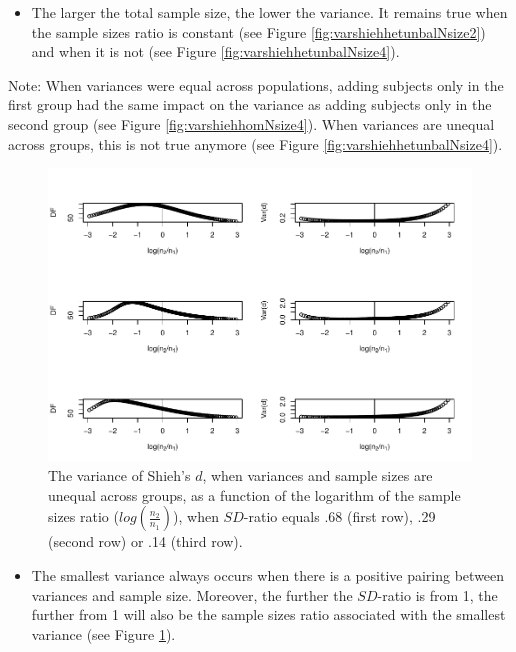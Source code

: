 \documentclass[
  english,
  man,mask]{apa6}
\providecommand{\tightlist}{%
  \setlength{\itemsep}{0pt}\setlength{\parskip}{0pt}}
\begin{document}
\begin{itemize}
\tightlist
\item
  The larger the total sample size, the lower the variance. It remains true when the sample sizes ratio is constant (see Figure \ref{fig:varshiehhetunbalNsize2}) and when it is not (see Figure \ref{fig:varshiehhetunbalNsize4}).
\end{itemize}

Note: When variances were equal across populations, adding subjects only in the first group had the same impact on the variance as adding subjects only in the second group (see Figure \ref{fig:varshiehhomNsize4}). When variances are unequal across groups, this is not true anymore (see Figure \ref{fig:varshiehhetunbalNsize4}).

\begin{figure}
\centering
\includegraphics{Theoretical-Variance-of-all-estimators-as-a-function-of-population-parameters_files/figure-latex/varshiehhetunbaldfandvar-1.pdf}
\caption{\label{fig:varshiehhetunbaldfandvar}The variance of Shieh's \(d\), when variances and sample sizes are unequal across groups, as a function of the logarithm of the sample sizes ratio (\(log \left( \frac{n_2}{n_1} \right)\)), when \(SD\)-ratio equals .68 (first row), .29 (second row) or .14 (third row).}
\end{figure}

\begin{itemize}
\tightlist
\item
  The smallest variance always occurs when there is a positive pairing between variances and sample size. Moreover, the further the \(SD\)-ratio is from 1, the further from 1 will also be the sample sizes ratio associated with the smallest variance (see Figure \ref{fig:varshiehhetunbaldfandvar}).
\end{itemize}
\end{document}
